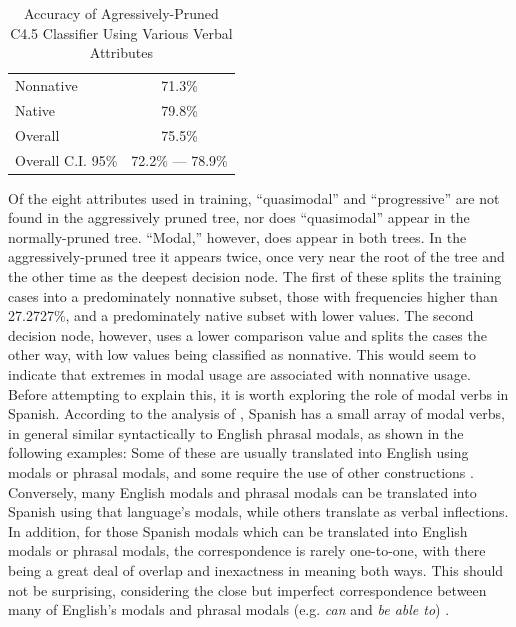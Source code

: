 \documentclass[main.tex]{subfiles}
\begin{document}
\begin{table}[htbp]
\centering
\caption{Accuracy of Agressively-Pruned C4.5 Classifier Using Various Verbal Attributes}
\begin{tabular}{l c}
\toprule
Nonnative & 71.3\% \\
Native & 79.8\% \\
Overall & 75.5\% \\
Overall C.I. 95\% & 72.2\% --- 78.9\%\\
\bottomrule
\end{tabular}
\label{table:pruned-basic-verb-results}
\end{table}
Of the eight attributes used in training, ``quasimodal'' and ``progressive'' are not found in the aggressively pruned tree, nor does ``quasimodal'' appear in the normally-pruned tree. ``Modal,'' however, does appear in both trees. In the aggressively-pruned tree it appears twice, once very near the root of the tree and the other time as the deepest decision node. The first of these splits the training cases into a predominately nonnative subset, those with frequencies higher than 27.2727\%, and a predominately native subset with lower values. The second decision node, however, uses a lower comparison value and splits the cases the other way, with low values being classified as nonnative. This would seem to indicate that extremes in modal usage are associated with nonnative usage. Before attempting to explain this, it is worth exploring the role of modal verbs in Spanish. According to the analysis of \citet{butt}, Spanish has a small array of modal verbs, in general similar syntactically to English phrasal modals, as shown in the following examples:
Some of these are usually translated into English using modals or phrasal modals, and some require the use of other constructions \citep[pp. 325-32]{butt}. Conversely, many English modals and phrasal modals can be translated into Spanish using that language's modals, while others translate as verbal inflections. In addition, for those Spanish modals which can be translated into English modals or phrasal modals, the correspondence is rarely one-to-one, with there being a great deal of overlap and inexactness in meaning both ways. This should not be surprising, considering the close but imperfect correspondence between many of English's modals and phrasal modals (e.g. \textit{can} and \textit{be able to}) \citep[pp. 137-157]{celce-murcia:1999}.
\end{document}
